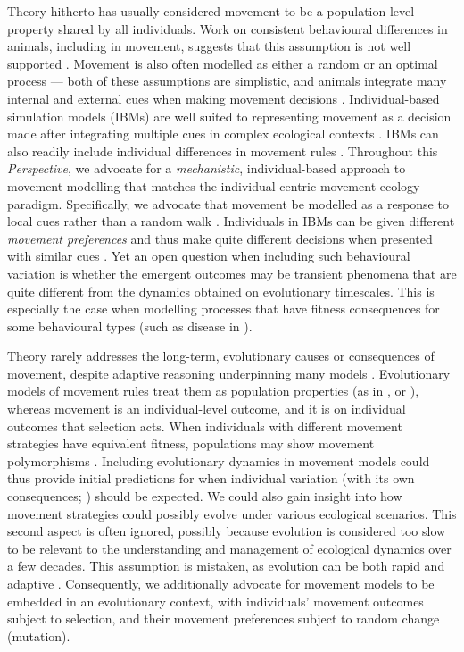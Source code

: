 Theory hitherto has usually considered movement to be a population-level property shared by all individuals.
Work on consistent behavioural differences in animals, including in movement, suggests that this assumption is not well supported \citep{spiegel2017,shaw2020,stuber2022,webber2018,webber2020,abrahms2017}.
Movement is also often modelled as either a random or an optimal process --- both of these assumptions are simplistic, and animals integrate many internal and external cues when making movement decisions \citep{nathan2008a}.
Individual-based simulation models (IBMs) are well suited to representing movement as a decision made after integrating multiple cues in complex ecological contexts \citep{huston1988,deangelis2019}.
IBMs can also readily include individual differences in movement rules \citep{spiegel2017}.
Throughout this \textit{Perspective}, we advocate for a \emph{mechanistic}, individual-based approach to movement modelling that matches the individual-centric movement ecology paradigm.
Specifically, we advocate that movement be modelled as a response to local cues rather than a random walk \citep[`mechanistic'; see][]{mueller2011}.
Individuals in IBMs can be given different \emph{movement preferences} and thus make quite different decisions when presented with similar cues \citep{getz2015,white2018}.
Yet an open question when including such behavioural variation is whether the emergent outcomes may be transient phenomena that are quite different from the dynamics obtained on evolutionary timescales.
This is especially the case when modelling processes that have fitness consequences for some behavioural types (such as disease in \cite[]{white2018}).

Theory rarely addresses the long-term, evolutionary causes or consequences of movement, despite adaptive reasoning underpinning many models \citep{charnov1976,fretwell1970}.
Evolutionary models of movement rules treat them as population properties (as in \cite*[]{dejager2011,dejager2020}, or \cite*[]{morris2011}), whereas movement is an individual-level outcome, and it is on individual outcomes that selection acts.
When individuals with different movement strategies have equivalent fitness, populations may show movement polymorphisms \citep{wolf2012,shaw2020,getz2015}.
Including evolutionary dynamics in movement models could thus provide initial predictions for when individual variation (with its own consequences; \cite{spiegel2017}) should be expected.
We could also gain insight into how movement strategies could possibly evolve under various ecological scenarios.
This second aspect is often ignored, possibly because evolution is considered too slow to be relevant to the understanding and management of ecological dynamics over a few decades.
This assumption is mistaken, as evolution can be both rapid and adaptive \citep[][]{bonnet2022}.
Consequently, we additionally advocate for movement models to be embedded in an evolutionary context, with individuals' movement outcomes subject to selection, and their movement preferences subject to random change (mutation).

